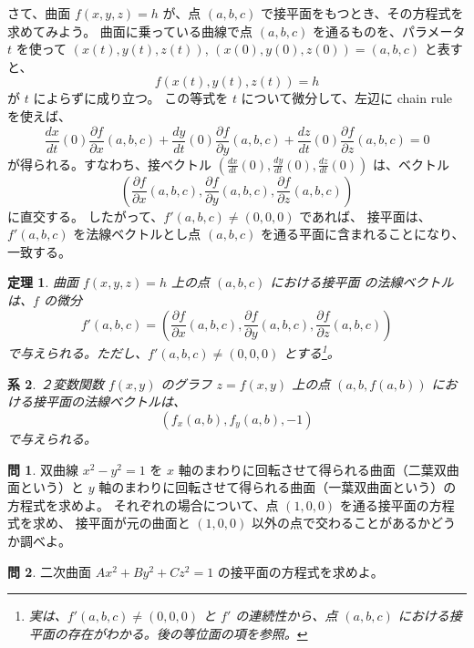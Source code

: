 \documentclass[a4paper]{jsarticle}
\newtheorem{Theorem}{定理}[section]
\newtheorem{Corollary}[Theorem]{系}
\theoremstyle{definition}
\newtheorem{Exercise}{問}%
\theoremstyle{remark}
\newcommand{\del}{\partial}
\begin{document}
さて、曲面 $f(x,y,z) = h$
が、点 $(a,b,c)$ で接平面をもつとき、その方程式を求めてみよう。
曲面に乗っている曲線で点 $(a,b,c)$ を通るものを、パラメータ $t$ を使って
$(x(t),y(t),z(t))$, $(x(0),y(0),z(0)) = (a,b,c)$ と表すと、
\[
f(x(t),y(t),z(t)) = h
\]
が $t$ によらずに成り立つ。
この等式を $t$ について微分して、左辺に chain rule を使えば、
\[
\frac{dx}{dt}(0)\frac{\del f}{\del x}(a,b,c)
+ \frac{dy}{dt}(0)\frac{\del f}{\del y}(a,b,c)
+ \frac{dz}{dt}(0)\frac{\del f}{\del z}(a,b,c)
= 0
\]
が得られる。すなわち、接ベクトル 
$(\frac{dx}{dt}(0),\frac{dy}{dt}(0),\frac{dz}{dt}(0))$
は、ベクトル
\[
\left(\frac{\del f}{\del x}(a,b,c),\frac{\del f}{\del y}(a,b,c),
\frac{\del f}{\del z}(a,b,c)\right)
\]
に直交する。
したがって、$f'(a,b,c) \not= (0,0,0)$ であれば、
接平面は、$f'(a,b,c)$ を法線ベクトルとし点 $(a,b,c)$ を通る平面に含まれることになり、一致する。

\begin{Theorem}
曲面 $f(x,y,z) = h$ 上の点 $(a,b,c)$ における接平面
の法線ベクトルは、$f$ の微分
\[
f'(a,b,c) = \left( \frac{\del f}{\del x}(a,b,c), \frac{\del f}{\del y}(a,b,c), 
\frac{\del f}{\del z}(a,b,c) \right)
\]
で与えられる。ただし、$f'(a,b,c) \not= (0,0,0)$ とする\footnote{実は、$f'(a,b,c) \not= (0,0,0)$ と
$f'$ の連続性から、点 $(a,b,c)$ における接平面の存在がわかる。後の等位面の項を参照。}。
\end{Theorem}

\begin{Corollary}
２変数関数 $f(x,y)$ のグラフ $z = f(x,y)$ 上の点 $(a,b,f(a,b))$ における接平面の法線ベクトルは、
\[ 
(f_x(a,b), f_y(a,b), -1) 
\]
で与えられる。
\end{Corollary}

\begin{Exercise}
双曲線 $x^2 - y^2 = 1$ を $x$ 軸のまわりに回転させて得られる曲面（二葉双曲面という）と
$y$ 軸のまわりに回転させて得られる曲面（一葉双曲面という）の方程式を求めよ。
それぞれの場合について、点 $(1,0,0)$ を通る接平面の方程式を求め、
接平面が元の曲面と $(1,0,0)$ 以外の点で交わることがあるかどうか調べよ。
\end{Exercise} 

\begin{Exercise}
二次曲面 $Ax^2 + By^2 + Cz^2 = 1$ の接平面の方程式を求めよ。
\end{Exercise}
\end{document}
